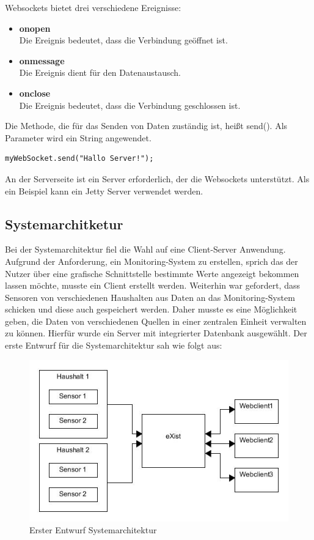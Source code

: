 Websockets bietet drei verschiedene Ereignisse:
\begin{itemize}
	\item \textbf{onopen} \\
	Die Ereignis bedeutet, dass die Verbindung geöffnet ist.
	\item \textbf{onmessage} \\
	Die Ereignis dient für den Datenaustausch.
	\item \textbf{onclose} \\
	Die Ereignis bedeutet, dass die Verbindung geschlossen ist.
\end{itemize}

Die Methode, die für das Senden von Daten zuständig ist, heißt send(). Als Parameter wird ein String angewendet.
\begin{lstlisting}
myWebSocket.send("Hallo Server!");
\end{lstlisting}

An der Serverseite ist ein Server erforderlich, der die Websockets unterstützt. Als ein Beispiel kann ein Jetty Server verwendet werden. 

\subsection{Systemarchitketur}
\label{subsec:Systemarchitketur}
Bei der Systemarchitektur fiel die Wahl auf eine Client-Server Anwendung. Aufgrund der Anforderung, ein Monitoring-System zu erstellen, sprich das der Nutzer über eine grafische Schnittstelle bestimmte Werte angezeigt bekommen lassen möchte, musste ein Client erstellt werden. Weiterhin war gefordert, dass Sensoren von verschiedenen Haushalten aus Daten an das Monitoring-System schicken und diese auch gespeichert werden. Daher musste es eine Möglichkeit geben, die Daten von verschiedenen Quellen in einer zentralen Einheit verwalten zu können. Hierfür wurde ein Server mit integrierter Datenbank ausgewählt. Der erste Entwurf für die Systemarchitektur sah wie folgt aus:

\begin{figure}[h]
\begin{center}
\includegraphics[scale=0.55]{images/sa1.jpg} 
\caption{Erster Entwurf Systemarchitektur}
\end{center}
\end{figure}

